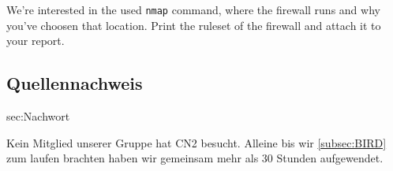 \documentclass[11pt,titlepage]{article}
\newenvironment{shadedquotation}
 {\begin{shaded*}
  \quoting[leftmargin=0pt, vskip=0pt]
 }
 {\endquoting
 \end{shaded*}
}
\begin{document}
\begin{shadedquotation}
  We’re interested in the used \lstinline!nmap! command, where the firewall runs and why you’ve choosen that location. Print the ruleset of the firewall and attach it to your report.
\end{shadedquotation}

\subsection{Quellennachweis}
\label{subsec:Quellennachweis}

\begingroup
\renewcommand{\section}[2]{}%


\endgroup  

\section{Nachwort}
\label{sec:Nachwort}

Kein Mitglied unserer Gruppe hat CN2 besucht. Alleine bis wir \ref{subsec:BIRD} zum laufen brachten haben wir gemeinsam mehr als 30 Stunden aufgewendet. 
\end{document}

